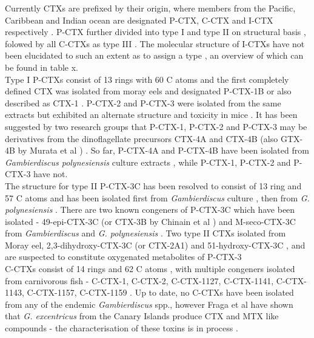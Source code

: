 \documentclass[12pt]{article}
\begin{document}
Currently CTXs are prefixed by their origin, where members from the Pacific, Caribbean and Indian ocean are designated P-CTX, C-CTX and I-CTX respectively \cite{}. %
P-CTX further divided into type I and type II on structural basis \cite{legrand1997two}, folowed by all C-CTXs as type III \cite{}. The molecular structure of I-CTXs have not been elucidated to such an extent as to assign a type \cite{hamilton2002multiple,hamilton2002isolation}, an overview of which can be found in table x.  \\
Type I P-CTXs consist of 13 rings with 60 C atoms \cite{murata1990structures,lewis1991purification,lewis1993origin} and the first completely defined CTX was isolated from moray eels and designated P-CTX-1B \cite{murata1990structures} or also described as CTX-1 \cite{lewis1991purification}. P-CTX-2 and P-CTX-3 were isolated from the same extracts but exhibited an alternate structure and toxicity in mice \cite{lewis1991purification}. It has been suggested by two research groups that P-CTX-1, P-CTX-2 and P-CTX-3 may be derivatives from the dinoflagellate precursors CTX-4A and CTX-4B (also GTX-4B by Murata et al \cite{murata1990structures}) \cite{lewis1993origin,yasumoto2000structural}. So far, P-CTX-4A and P-CTX-4B have been isolated from \emph{Gambierdiscus polynesiensis} culture extracts \cite{chinain2010growth}, while P-CTX-1, P-CTX-2 and P-CTX-3 have not. \\
The structure for type II P-CTX-3C has been resolved to consist of 13 ring and 57 C atoms and has been isolated first from \emph{Gambierdiscus} culture \cite{satake1993structure}, then from \emph{G. polynesiensis} \cite{chinain2010growth}. There are two known congeners of P-CTX-3C which have been isolated - 49-epi-CTX-3C (or CTX-3B by Chinain et al \cite{chinain2010growth}) and M-seco-CTX-3C from \emph{Gambierdiscus} \cite{satake1993structure} and \emph{G. polynesiensis} \cite{chinain2010growth}. Two type II CTXs isolated from Moray eel, 2,3-dihydroxy-CTX-3C (or CTX-2A1) and 51-hydroxy-CTX-3C \cite{satake1998isolation}, and are suspected to constitute oxygenated metabolites of P-CTX-3 \\ %
C-CTXs consist of 14 rings and 62 C atoms \cite{vernoux1997isolation,lewis1998structure,pottier2003identification,pottier2002characterisation}, with multiple congeners isolated from carnivorous fish - C-CTX-1, C-CTX-2, C-CTX-1127, C-CTX-1141, C-CTX-1143, C-CTX-1157, C-CTX-1159 \cite{vernoux1997isolation,lewis1998structure,pottier2003identification,pottier2002characterisation}. Up to date, no C-CTXs have been isolated from any of the endemic \emph{Gambierdiscus} spp., however Fraga et al have shown that \emph{G. excentricus} from the Canary Islands produce CTX and MTX like compounds - the characterisation of these toxins is in process \cite{fraga2011gambierdiscus}. \\
\end{document}
